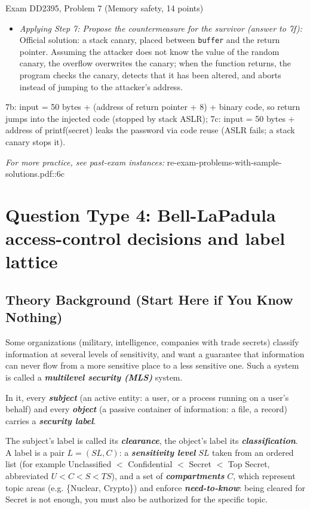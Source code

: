 \documentclass[12pt, a4paper]{article}
\newcommand{\term}[1]{\textbf{\textit{#1}}}        %
\begin{document}
\begin{practicebox}{Exam DD2395, Problem 7 (Memory safety, 14 points)}
\begin{itemize}
    \item \textit{Applying Step 7: Propose the countermeasure for the survivor (answer to 7f):} Official solution: a stack canary, placed between \texttt{buffer} and the return pointer. Assuming the attacker does not know the value of the random canary, the overflow overwrites the canary; when the function returns, the program checks the canary, detects that it has been altered, and aborts instead of jumping to the attacker's address.
\end{itemize}

\begin{answerbox}
7b: input = 50 bytes + (address of return pointer + 8) + binary code, so return jumps into the injected code (stopped by stack ASLR); 7c: input = 50 bytes + address of printf(secret) leaks the password via code reuse (ASLR fails; a stack canary stops it).
\end{answerbox}
\end{practicebox}

\textit{For more practice, see past-exam instances:} re-exam-problems-with-sample-solutions.pdf::6c

\section{Question Type 4: Bell-LaPadula access-control decisions and label lattice}

\subsection*{Theory Background (Start Here if You Know Nothing)}

Some organizations (military, intelligence, companies with trade secrets) classify information at several levels of sensitivity, and want a guarantee that information can never flow from a more sensitive place to a less sensitive one. Such a system is called a \term{multilevel security (MLS)} system.

In it, every \term{subject} (an active entity: a user, or a process running on a user's behalf) and every \term{object} (a passive container of information: a file, a record) carries a \term{security label}.

The subject's label is called its \term{clearance}, the object's label its \term{classification}. A label is a pair $L = (SL, C)$: a \term{sensitivity level} $SL$ taken from an ordered list (for example Unclassified $<$ Confidential $<$ Secret $<$ Top Secret, abbreviated $U < C < S < TS$), and a set of \term{compartments} $C$, which represent topic areas (e.g. \{Nuclear, Crypto\}) and enforce \term{need-to-know}: being cleared for Secret is not enough, you must also be authorized for the specific topic.
\end{document}
